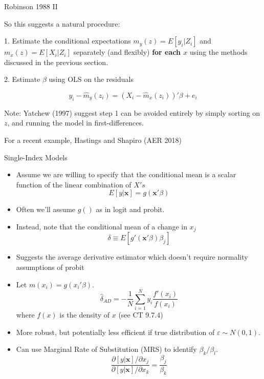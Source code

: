 \begin{frame}{Robinson 1988 II}

  So this suggests a natural procedure: 

  1. Estimate the conditional expectations $m_y(z) = E[y_i | Z_i]$ and $m_x(z) = E[X_i | Z_i]$ separately (and flexibly) \textbf{for each $x$} using the methods discussed in the previous section. 

  2. Estimate $\beta$ using OLS on the residuals 
  
  $$y_i - \hat m_y(z_i) =  (X_i - \hat m_x(z_i))'\beta + e_i $$

  \pause 

  Note: Yatchew (1997) suggest step 1 can be avoided entirely by simply sorting on $z$, and running the model in first-differences. 

  For a recent example, Hastings and Shapiro (AER 2018)
\end{frame}

\begin{frame}[allowframebreaks]{Single-Index Models}
   
  \begin{itemize}
  \item Assume we are willing to specify that the conditional mean is a scalar function of the linear combination of $X's$ 
  $$ E \left[ y | \mathbf{x} \right] = g(\mathbf{x}'\beta ) $$ 
  \item Often we'll assume $g()$ as in logit and probit. 
  \item Instead, note that the conditional mean of a change in $x_j$ 
  $$ \delta \equiv E \left[g'(\mathbf{x}'\beta ) \beta_j \right] $$ 
  
  \item Suggests the \alert{average derivative estimator} which doesn't require normality assumptions of probit
  \item Let $m(x_i) = g(x_i'\beta)$. 
  $$ \hat \delta_{AD} = -\frac{1}{N} \sum_{i=1}^N y_i \frac{f'(x_i)}{f(x_i)} $$
  where $f(x)$ is the density of $x$ (see CT 9.7.4)

  \item More robust, but potentially less efficient if true distribution of $\varepsilon \sim N(0,1)$.
 
  \item Can use Marginal Rate of Substitution (MRS) to identify $\beta_k / \beta_l$.
  $$ \frac{ \partial \left[ y | \mathbf{x} \right] / \partial x_j }{ \partial \left[ y | \mathbf{x} \right] / \partial x_k} = \frac{\beta_j}{\beta_k} $$ 
  
   \end{itemize}
\end{frame}

